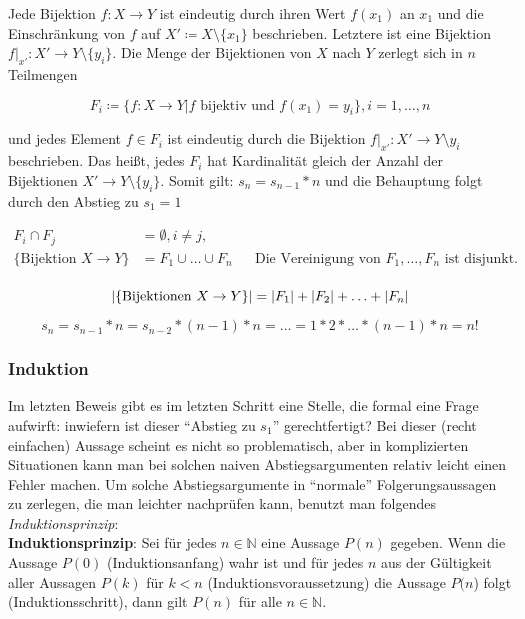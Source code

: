 \documentclass{article}
\begin{document}
Jede Bijektion $f \colon X \to Y$ ist eindeutig durch ihren Wert $f(x_1)$ an $x_1$ und die Einschränkung
von $f$ auf $X' \coloneqq X \setminus \{ x_1 \}$ beschrieben.
Letztere ist eine Bijektion $f|_{x'} \colon X' \to Y \setminus \{ y_i \}$.
Die Menge der Bijektionen von $X$ nach $Y$ zerlegt sich in $n$ Teilmengen

\[
  F_i \coloneqq \{ f \colon X \to Y | f \text{ bijektiv und } f(x_1) = y_i \},  i = 1, \ldots, n
\]

und jedes Element $f \in F_i$ ist eindeutig durch die Bijektion $f|_{x'} \colon X' \to Y \setminus {y_i}$
beschrieben.
Das heißt, jedes $F_i$ hat Kardinalität gleich der Anzahl der Bijektionen $X' \to Y \setminus \{ y_i \}$.
Somit gilt: $s_n = s_{n - 1} * n$ und die Behauptung folgt durch den Abstieg zu $s_1 = 1$

\begin{align*}
  F_i \cap F_j                    &= \emptyset, i \ne j, \\
  \{ \text{Bijektion } X \to Y \} &= F_1 \cup \ldots \cup F_n && \text{Die Vereinigung von } F_1, \ldots, F_n \text{ ist disjunkt.}\\
\end{align*}

\[
  \abs{\{ \text{Bijektionen } X \to Y \}} = \abs{F_1} + \abs{F_2} + \ldots + \abs{F_n}
\]

\[
  s_n = s_{n - 1} * n = s_{n - 2} * (n - 1) * n = \ldots = 1 * 2 * \ldots * (n - 1) * n = n!
\]

\subsubsection*{Induktion}

Im letzten Beweis gibt es im letzten Schritt eine Stelle, die formal eine Frage aufwirft:
inwiefern ist dieser ``Abstieg zu $s_1$'' gerechtfertigt?
Bei dieser (recht einfachen) Aussage scheint es nicht so problematisch, aber in komplizierten Situationen
kann man bei solchen naiven Abstiegsargumenten relativ leicht einen Fehler machen.
Um solche Abstiegsargumente in ``normale'' Folgerungsaussagen zu zerlegen, die man leichter nachprüfen
kann, benutzt man folgendes \emph{Induktionsprinzip}: \\

\textbf{Induktionsprinzip}: Sei für jedes $n \in \mathbb{N}$ eine Aussage $P(n)$ gegeben.
Wenn die Aussage $P(0)$ (Induktionsanfang) wahr ist und für jedes $n$ aus der Gültigkeit aller
Aussagen $P(k)$ für $k < n$ (Induktionsvoraussetzung) die Aussage $P(n$) folgt (Induktionsschritt),
dann gilt $P(n)$ für alle $n \in \mathbb{N}$. \\
\end{document}
